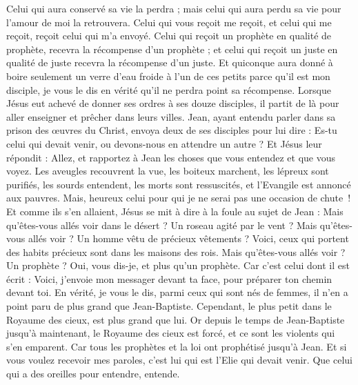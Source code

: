 \begin{multicols}{2}
{Celui qui aura conservé sa vie la perdra ; mais celui qui aura perdu sa vie pour l'amour de moi la retrouvera.
Celui qui vous reçoit me reçoit, et celui qui me reçoit, reçoit celui qui m'a envoyé.
Celui qui reçoit un prophète en qualité de prophète, recevra la récompense d'un prophète ; et celui qui reçoit un juste en qualité de juste recevra la récompense d'un juste.
Et quiconque aura donné à boire seulement un verre d'eau froide à l’un de ces petits parce qu’il est mon disciple, je vous le dis en vérité qu'il ne perdra point sa récompense.
\VerseOne{}Lorsque Jésus eut achevé de donner ses ordres à ses douze disciples, il partit de là pour aller enseigner et prêcher dans leurs villes.
Jean, ayant entendu parler dans sa prison des œuvres du Christ, envoya deux de ses disciples pour lui dire :
Es-tu celui qui devait venir, ou devons-nous en attendre un autre ?
Et Jésus leur répondit : Allez, et rapportez à Jean les choses que vous entendez et que vous voyez.
Les aveugles recouvrent la vue, les boiteux marchent, les lépreux sont purifiés, les sourds entendent, les morts sont ressuscités, et l'Evangile est annoncé aux pauvres{}.
Mais, heureux celui pour qui je ne serai pas une occasion de chute !
Et comme ils s'en allaient, Jésus se mit à dire à la foule au sujet de Jean : Mais qu'êtes-vous allés voir dans le désert ? Un roseau agité par le vent ?
Mais qu'êtes-vous allés voir ? Un homme vêtu de précieux vêtements ? Voici, ceux qui portent des habits précieux sont dans les maisons des rois.
Mais qu'êtes-vous allés voir ? Un prophète ? Oui, vous dis-je, et plus qu'un prophète.
Car c’est celui dont il est écrit : Voici, j'envoie mon messager{} devant ta face, pour préparer ton chemin devant toi.
En vérité, je vous le dis, parmi ceux qui sont nés de femmes, il n'en a point paru de plus grand que Jean-Baptiste. Cependant, le plus petit dans le Royaume des cieux, est plus grand que lui.
Or depuis le temps de Jean-Baptiste jusqu’à maintenant, le Royaume des cieux est forcé, et ce sont les violents qui s’en emparent.
Car tous les prophètes et la loi ont prophétisé jusqu'à Jean.
Et si vous voulez recevoir mes paroles, c'est lui qui est l'Elie{} qui devait venir.
Que celui qui a des oreilles pour entendre, entende.
}
\end{multicols}
